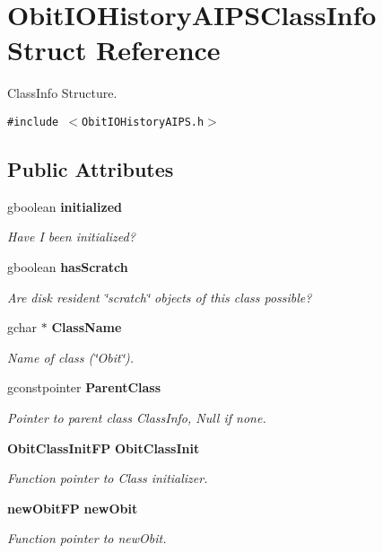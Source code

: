 \section{Obit\-IOHistory\-AIPSClass\-Info Struct Reference}
\label{structObitIOHistoryAIPSClassInfo}
Class\-Info Structure.  


{\tt \#include $<$Obit\-IOHistory\-AIPS.h$>$}

\subsection*{Public Attributes}
\begin{CompactItemize}
\item 
gboolean {\bf initialized}
\begin{CompactList}\small\item\em Have I been initialized? \item\end{CompactList}\item 
gboolean {\bf has\-Scratch}
\begin{CompactList}\small\item\em Are disk resident \char`\"{}scratch\char`\"{} objects of this class possible? \item\end{CompactList}\item 
gchar $\ast$ {\bf Class\-Name}
\begin{CompactList}\small\item\em Name of class (\char`\"{}Obit\char`\"{}). \item\end{CompactList}\item 
gconstpointer {\bf Parent\-Class}
\begin{CompactList}\small\item\em Pointer to parent class Class\-Info, Null if none. \item\end{CompactList}\item 
{\bf Obit\-Class\-Init\-FP} {\bf Obit\-Class\-Init}
\begin{CompactList}\small\item\em Function pointer to Class initializer. \item\end{CompactList}\item 
{\bf new\-Obit\-FP} {\bf new\-Obit}
\begin{CompactList}\small\item\em Function pointer to new\-Obit. \item\end{CompactList}\item 

\end{CompactItemize}
